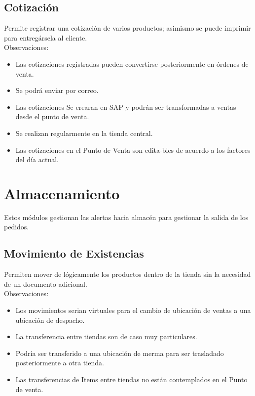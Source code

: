 \documentclass[pdftex,12pt,oneside,a4paper,spanish, english, brazil]{abntex2}
\begin{document}
\begin{sloppypar}
              \subsection{Cotización}
              Permite registrar una cotización de varios productos; asimismo se puede imprimir para entregársela al cliente.\\
              Observaciones:
              
              \begin{itemize}
                \item  Las cotizaciones registradas pueden convertirse posteriormente en órdenes de venta. 
                \item Se podrá enviar por correo.
                \item Las cotizaciones Se crearan en SAP y podrán ser transformadas a ventas desde el punto de venta.
                \item Se realizan regularmente en la tienda central.
                \item Las cotizaciones en el Punto de Venta son edita-bles de acuerdo a los factores del día actual.
              \end{itemize}
            \section{Almacenamiento}
            Estos módulos gestionan las alertas hacia almacén para gestionar la salida de los pedidos.
              \subsection{Movimiento de Existencias}
              Permiten mover de lógicamente los productos dentro de la tienda sin la necesidad de un documento adicional.\\
              Observaciones:
              \begin{itemize}
                \item Los movimientos serian virtuales para el cambio de ubicación de ventas a una ubicación de despacho.
                \item La transferencia entre tiendas son de caso muy particulares.
                \item Podría ser transferido a una ubicación de merma para ser trasladado posteriormente a otra tienda.
                \item Las transferencias de Items entre tiendas no están contemplados en el Punto de venta.
              \end{itemize}

\end{sloppypar}
\end{document}

